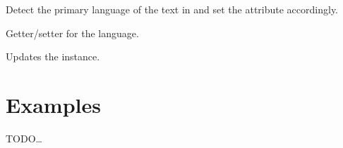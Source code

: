 \documentclass[letterpaper,10pt,english]{sphinxmanual}
\begin{document}
\begin{fulllineitems}

\begin{fulllineitems}
\label{\detokenize{generated/bp_text.txt:bp_text.txt.TxtFile.get_primary_lang}}
\pysigstartsignatures
\pysiglinewithargsret
{}
{}
{}
\pysigstopsignatures
\sphinxAtStartPar
Detect the primary language of the text in  and set the
 attribute accordingly.

\end{fulllineitems}


\begin{fulllineitems}
\label{\detokenize{generated/bp_text.txt:bp_text.txt.TxtFile.lang}}
\pysigstartsignatures
\pysigline
{}
\pysigstopsignatures
\sphinxAtStartPar
Getter/setter for the language.

\end{fulllineitems}


\begin{fulllineitems}
\label{\detokenize{generated/bp_text.txt:bp_text.txt.TxtFile.update}}
\pysigstartsignatures
\pysiglinewithargsret
{}
{}
{}
\pysigstopsignatures
\sphinxAtStartPar
Updates the instance.

\end{fulllineitems}


\end{fulllineitems}


\sphinxstepscope


\chapter{Examples}
\label{\detokenize{examples:examples}}\label{\detokenize{examples::doc}}
\sphinxAtStartPar
TODO…
\end{document}
